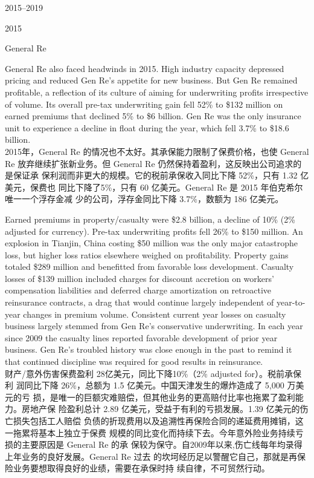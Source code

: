 \begin{chapter}{2015--2019}
\begin{section}{2015}
\begin{subsection}{General Re}
\begin{verseparallel}
  {
    General Re also faced headwinds in 2015. High industry capacity depressed
    pricing and reduced Gen Re's appetite for new business. But Gen Re remained
    profitable, a reflection of its culture of aiming for underwriting profits
    irrespective of volume. Its overall pre-tax underwriting gain fell 52\% to
    \$132 million on earned premiums that declined 5\% to \$6 billion. Gen Re was
    the only insurance unit to experience a decline in float during the year,
    which fell 3.7\% to \$18.6 billion. \\
  }
  {
    2015年，General Re 的情况也不太好。其承保能力限制了保费价格，也使 General Re
    放弃继续扩张新业务。但 General Re 仍然保持着盈利，这反映出公司追求的是保证承
    保利润而非更大的规模。它的税前承保收入同比下降 52\%，只有 1.32 亿美元，保费也
    同比下降了5\%，只有 60 亿美元。General Re 是 2015 年伯克希尔唯一一个浮存金减
    少的公司，浮存金同比下降 3.7\%，数额为 186 亿美元。
  }
\end{verseparallel}

\begin{verseparallel}
  {
    Earned premiums in property/casualty were \$2.8 billion, a decline of 10\%
    (2\% adjusted for currency). Pre-tax underwriting profits fell 26\% to \$150
    million. An explosion in Tianjin, China costing \$50 million was the only
    major catastrophe loss, but higher loss ratios elsewhere weighed on
    profitability. Property gains totaled \$289 million and benefitted from
    favorable loss development. Casualty losses of \$139 million included
    charges for discount accretion on workers' compensation liabilities and
    deferred charge amortization on retroactive reinsurance contracts, a drag
    that would continue largely independent of year-to-year changes in premium
    volume. Consistent current year losses on casualty business largely stemmed
    from Gen Re's conservative underwriting. In each year since 2009 the
    casualty lines reported favorable development of prior year business. Gen
    Re's troubled history was close enough in the past to remind it that
    continued discipline was required for good results in reinsurance. \\
  }
  {
    财产/意外伤害保费盈利 28亿美元，同比下降10\%（2\% adjusted for）。税前承保利
    润同比下降 26\%，总额为 1.5 亿美元。中国天津发生的爆炸造成了 5,000 万美元的亏
    损，是唯一的巨额灾难赔偿，但其他业务的更高赔付比率也拖累了盈利能力。房地产保
    险盈利总计 2.89 亿美元，受益于有利的亏损发展。1.39 亿美元的伤亡损失包括工人赔偿
    负债的折现费用以及追溯性再保险合同的递延费用摊销，这一拖累将基本上独立于保费
    规模的同比变化而持续下去。今年意外险业务持续亏损的主要原因是 General Re 的承
    保较为保守。自2009年以来,伤亡线每年均录得上年业务的良好发展。General Re 过去
    的坎坷经历足以警醒它自己，那就是再保险业务要想取得良好的业绩，需要在承保时持
    续自律，不可贸然行动。
  }
\end{verseparallel}


\end{subsection}
\end{section}
\end{chapter}
